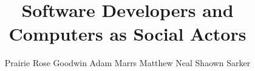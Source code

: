 \documentclass{sig-alternate-05-2015}
\begin{document}


\doi{}

\isbn{}


%

\title{Software Developers and Computers as Social Actors}
%

%
\author{Prairie Rose Goodwin \qquad Adam Marrs \qquad Matthew Neal \qquad Shaown Sarker\\ \\ \\ \\ \\}
\end{document}
